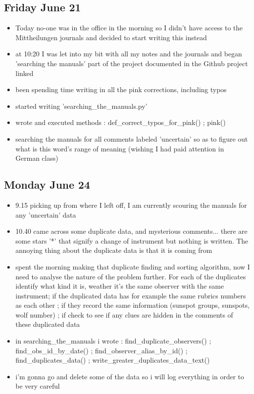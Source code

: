 \documentclass[12pt]{article}
\begin{document}
\subsection{Friday June 21}
\begin{itemize}
    \item Today no-one was in the office in the morning so I didn't have access to the Mittheilungen journals and decided to start writing this instead
    \item at 10:20 I was let into my bit with all my notes and the journals and began 'searching the manuals' part of the project documented in the Github project linked
    \item been spending time writing in all the pink corrections, including typos
    \item started writing 'searching\_the\_manuals.py'
    \item wrote and executed methods : def\_correct\_typos\_for\_pink() ; pink()
    \item searching the manuals for all comments labeled 'uncertain' so as to figure out what is this word's range of meaning (wishing I had paid attention in German class)
\end{itemize}
    
\subsection{Monday June 24}
\begin{itemize}
    \item 9.15 picking up from where I left off, I am currently scouring the manuals for any 'uncertain' data
    \item 10.40 came across some duplicate data, and mysterious comments... there are some stars '*' that signify a change of instrument but nothing is written. The annoying thing about the duplicate data is that it is coming from 
    \item spent the morning making that duplicate finding and sorting algorithm, now I need to analyse the nature of the problem further. For each of the duplicates identify what kind it is, weather it's the same observer with the same instrument; if the duplicated data has for example the same rubrics numbers as each other ; if they record the same information (sunspot groups, sunspots, wolf number) ; if check to see if any clues are hidden in the comments of these duplicated data
    \item in searching\_the\_manuals i wrote : find\_duplicate\_observers() ; find\_obs\_id\_by\_date() ; find\_observer\_alias\_by\_id() ; find\_duplicates\_data() ; write\_greater\_duplicates\_data\_text()
    \item i'm gonna go and delete some of the data so i will log everything in order to be very careful
\end{itemize}
    
\end{document}
